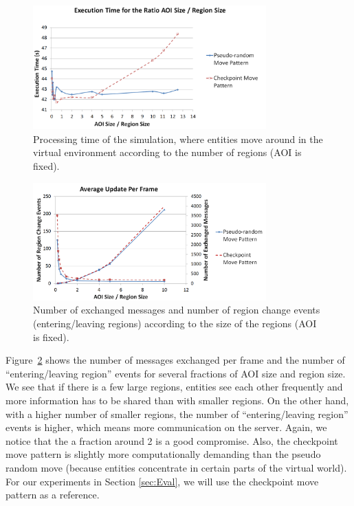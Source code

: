 \documentclass[]{elsarticle}
\begin{document}
\begin{figure}[h]
\centering
\includegraphics[width=0.8\textwidth]{acm-vrst13-img/matlab_processing.png}
\caption{Processing time of the simulation, where entities move around in the virtual environment according to the number of regions (AOI is fixed).}
\label{fig:matlab_processing}
\end{figure}

\begin{figure}[h]
\centering
\includegraphics[width=0.8\textwidth]{acm-vrst13-img/matlab_exchanged_messages.png}
\caption{Number of exchanged messages and number of region change events (entering/leaving regions) according to the size of the regions (AOI is fixed).}
\label{fig:matlab_exchanged_messages}
\end{figure}


Figure~\ref{fig:matlab_exchanged_messages} shows the number of messages exchanged per frame and the number of ``entering/leaving region'' events for several fractions of AOI size and region size. We see that if there is a few large regions, entities see each other frequently and more information has to be shared than with smaller regions.
On the other hand, with a higher number of smaller regions, the number of ``entering/leaving region'' events is higher, which means more communication on the server.
Again, we notice that the a fraction around 2 is a good compromise.
Also, the checkpoint move pattern is slightly more computationally demanding than the pseudo random move (because entities concentrate in certain parts of the virtual world).
For our experiments in Section \ref{sec:Eval}, we will use the checkpoint move pattern as a reference.
\end{document}
